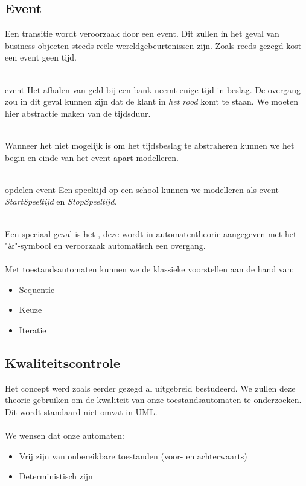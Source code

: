 \documentclass[../../main.tex]{subfiles}
\begin{document}
\subsection{Event}
Een transitie wordt veroorzaak door een event. Dit zullen in het geval van business objecten steeds re\"ele-wereldgebeurtenissen zijn. Zoals reeds gezegd kost een event geen tijd.\\
\\
\begin{ex}{event}
Het afhalen van geld bij een bank neemt enige tijd in beslag.  De overgang zou in dit geval kunnen zijn dat de klant in \textit{het rood} komt te staan. We moeten hier abstractie maken van de tijdsduur.
\end{ex}
\\
Wanneer het niet mogelijk is om het tijdsbeslag te abstraheren kunnen we het begin en einde van het event apart modelleren. \\
\\
\begin{ex}{opdelen event}
Een speeltijd op een school kunnen we modelleren als event \textit{StartSpeeltijd} en \textit{StopSpeeltijd}.
\end{ex}
\\
Een speciaal geval is het , deze wordt in automatentheorie aangegeven met het "\&"-symbool en veroorzaak automatisch een overgang.\\
\\
Met toestandsautomaten kunnen we de klassieke voorstellen aan de hand van:
\begin{itemize}
	\item Sequentie
	\item Keuze
	\item Iteratie
\end{itemize}

\subsection{Kwaliteitscontrole}
Het concept werd zoals eerder gezegd al uitgebreid bestudeerd. We zullen deze theorie gebruiken om de kwaliteit van onze toestandsautomaten te onderzoeken. Dit wordt standaard niet omvat in UML. \\
\\
We wensen dat onze automaten:
\begin{itemize}
	\item Vrij zijn van onbereikbare toestanden (voor- en achterwaarts)
	\item Deterministisch zijn
\end{itemize}
\end{document}
